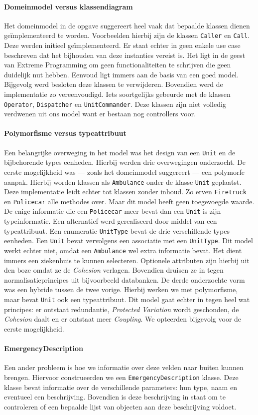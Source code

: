 \paragraph{Domeinmodel versus klassendiagram}
Het domeinmodel in de opgave suggereert heel vaak dat bepaalde klassen dienen ge\"implementeerd te worden. Voorbeelden hierbij zijn de klassen \texttt{Caller} en \texttt{Call}. Deze werden initieel ge\"implementeerd. Er staat echter in geen enkele use case beschreven dat het bijhouden van deze instanties vereist is. Het ligt in de geest van Extreme Programming om geen functionaliteiten te schrijven die geen duidelijk nut hebben. Eenvoud ligt immers aan de basis van een goed model. Bijgevolg werd besloten deze klassen te verwijderen. Bovendien werd de implementatie zo vereenvoudigd. Iets soortgelijks gebeurde met de klassen \texttt{Operator}, \texttt{Dispatcher} en \texttt{UnitCommander}. Deze klassen zijn niet volledig verdwenen uit ons model want er bestaan nog controllers voor.
\paragraph{Polymorfisme versus typeattribuut}
Een belangrijke overweging in het model was het design van een \texttt{Unit} en de bijbehorende types eenheden. Hierbij werden drie overwegingen onderzocht. De eerste mogelijkheid was --- zoals het domeinmodel suggereert --- een polymorfe aanpak. Hierbij worden klassen als \texttt{Ambulance} onder de klasse \texttt{Unit} geplaatst. Deze implementatie leidt echter tot klassen zonder inhoud. Zo erven \texttt{Firetruck} en \texttt{Policecar} alle methodes over. Maar dit model heeft geen toegevoegde waarde. De enige informatie die een \texttt{Policecar} meer bevat dan een \texttt{Unit} is zijn typeinformatie. Een alternatief werd gerealiseerd door middel van een typeattribuut. Een enumeratie \texttt{UnitType} bevat de drie verschillende types eenheden. Een \texttt{Unit} bevat vervolgens een associatie met een \texttt{UnitType}. Dit model werkt echter niet, omdat een \texttt{Ambulance} wel extra informatie bevat. Het dient immers een ziekenhuis te kunnen selecteren. Optionele attributen zijn hierbij uit den boze omdat ze de \textit{Cohesion} verlagen. Bovendien druisen ze in tegen normalisatieprincipes uit bijvoorbeeld databanken. De derde onderzochte vorm was een hybride tussen de twee vorige. Hierbij werken we met polymorfisme, maar bevat \texttt{Unit} ook een typeattribuut. Dit model gaat echter in tegen heel wat principes: er ontstaat redundantie, \textit{Protected Variation} wordt geschonden, de \textit{Cohesion} daalt en er ontstaat meer \textit{Coupling}. We opteerden bijgevolg voor de eerste mogelijkheid.
\paragraph{EmergencyDescription}
Een ander probleem is hoe we informatie over deze velden naar buiten kunnen brengen. Hiervoor construeerden we een \verb+EmergencyDescription+ klasse. Deze klasse bevat informatie over de verschillende parameters: hun type, naam en eventueel een beschrijving. Bovendien is deze beschrijving in staat om te controleren of een bepaalde lijst van objecten aan deze beschrijving voldoet.